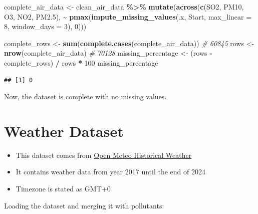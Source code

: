 \documentclass[
]{article}
\newenvironment{Shaded}{\begin{snugshade}}{\end{snugshade}}
\newcommand{\AttributeTok}[1]{\textcolor[rgb]{0.13,0.29,0.53}{#1}}
\newcommand{\CommentTok}[1]{\textcolor[rgb]{0.56,0.35,0.01}{\textit{#1}}}
\newcommand{\DecValTok}[1]{\textcolor[rgb]{0.00,0.00,0.81}{#1}}
\newcommand{\FunctionTok}[1]{\textcolor[rgb]{0.13,0.29,0.53}{\textbf{#1}}}
\newcommand{\NormalTok}[1]{#1}
\newcommand{\OtherTok}[1]{\textcolor[rgb]{0.56,0.35,0.01}{#1}}
\newcommand{\SpecialCharTok}[1]{\textcolor[rgb]{0.81,0.36,0.00}{\textbf{#1}}}
\newcommand{\StringTok}[1]{\textcolor[rgb]{0.31,0.60,0.02}{#1}}
\providecommand{\tightlist}{%
  \setlength{\itemsep}{0pt}\setlength{\parskip}{0pt}}
\begin{document}
\begin{Shaded}
\begin{Highlighting}[]
\NormalTok{complete\_air\_data }\OtherTok{\textless{}{-}}\NormalTok{ clean\_air\_data }\SpecialCharTok{\%\textgreater{}\%}
  \FunctionTok{mutate}\NormalTok{(}\FunctionTok{across}\NormalTok{(}\FunctionTok{c}\NormalTok{(SO2, PM10, O3, NO2, }\StringTok{\textasciigrave{}}\AttributeTok{PM2.5}\StringTok{\textasciigrave{}}\NormalTok{), }\SpecialCharTok{\textasciitilde{}} 
    \FunctionTok{pmax}\NormalTok{(}\FunctionTok{impute\_missing\_values}\NormalTok{(.x, Start, }\AttributeTok{max\_linear =} \DecValTok{8}\NormalTok{, }\AttributeTok{window\_days =} \DecValTok{3}\NormalTok{), }\DecValTok{0}\NormalTok{)))}

\NormalTok{complete\_rows }\OtherTok{\textless{}{-}} \FunctionTok{sum}\NormalTok{(}\FunctionTok{complete.cases}\NormalTok{(complete\_air\_data)) }\CommentTok{\# 60845}
\NormalTok{rows }\OtherTok{\textless{}{-}} \FunctionTok{nrow}\NormalTok{(complete\_air\_data) }\CommentTok{\# 70128}
\NormalTok{missing\_percentage }\OtherTok{\textless{}{-}}\NormalTok{ (rows }\SpecialCharTok{{-}}\NormalTok{ complete\_rows) }\SpecialCharTok{/}\NormalTok{ rows }\SpecialCharTok{*} \DecValTok{100}
\NormalTok{missing\_percentage}
\end{Highlighting}
\end{Shaded}

\begin{verbatim}
## [1] 0
\end{verbatim}

Now, the dataset is complete with no missing values.

\section{Weather Dataset}\label{weather-dataset}

\begin{itemize}
\tightlist
\item
  This dataset comes from
  \href{https://open-meteo.com/en/docs/historical-weather-api}{Open
  Meteo Historical Weather}
\item
  It contains weather data from year 2017 until the end of 2024
\item
  Timezone is stated as GMT+0
\end{itemize}

Loading the dataset and merging it with pollutants:
\end{document}
